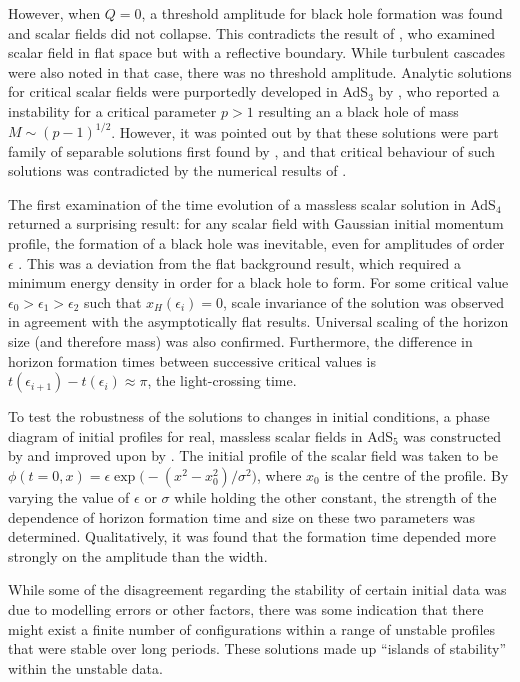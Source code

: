 \documentclass[../PhD.tex]{subfiles}
\begin{document}
However, when $Q = 0$, a threshold amplitude for black hole formation was found and scalar fields did not collapse. This contradicts the result of \cite{1208.2934}, who examined scalar field in flat space but with a reflective boundary. While turbulent cascades were also noted in that case, there was no threshold amplitude. Analytic solutions for critical scalar fields were purportedly developed in AdS$_3$ by \cite{1309.1629}, who reported a instability for a critical parameter $p > 1$ resulting an a black hole of mass $M \sim (p - 1)^{1/2}$. However, it was pointed out by \cite{1401.4093} that these solutions were part family of separable solutions first found by \cite{gr-qc/0109002}, and that critical behaviour of such solutions was contradicted by the numerical results of \cite{gr-qc/0007008, gr-qc/0008060}.

The first examination of the time evolution of a massless scalar solution in AdS$_4$ returned a surprising result: for any scalar field with Gaussian initial momentum profile, the formation of a black hole was inevitable, even for amplitudes of order $\epsilon$ \cite{1104.3702}. This was a deviation from the flat background result, which required a minimum energy density in order for a black hole to form. For some critical value $\epsilon_0 > \epsilon_1 > \epsilon_2$ such that $x_H(\epsilon_i) = 0$, scale invariance of the solution was observed in agreement with the asymptotically flat results. Universal scaling of the horizon size (and therefore mass) was also confirmed. Furthermore, the difference in horizon formation times between successive critical values is $t(\epsilon_{i+1}) - t(\epsilon_i) \approx \pi$, the light-crossing time.

To test the robustness of the solutions to changes in initial conditions, a phase diagram of initial profiles for real, massless scalar fields in AdS$_5$ was constructed by \cite{1106.2339} and improved upon by \cite{1110.5823}. The initial profile of the scalar field was taken to be $\phi(t=0, x) = \epsilon \exp \big( -(x^2 - x_0^2) / \sigma^2 \big)$, where $x_0$ is the centre of the profile. By varying the value of $\epsilon$ or $\sigma$ while holding the other constant, the strength of the dependence of horizon formation time and size on these two parameters was determined. Qualitatively, it was found that the formation time depended more strongly on the amplitude than the width. 

While some of the disagreement regarding the stability of certain initial data was due to modelling errors or other factors, there was some indication that there might exist a finite number of configurations within a range of unstable profiles that were stable over long periods. These solutions made up ``islands of stability'' within the unstable data.
 
\end{document}
